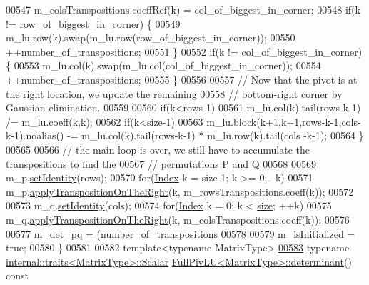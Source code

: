 \begin{DoxyCode}
00547     m\_colsTranspositions.coeffRef(k) = col\_of\_biggest\_in\_corner;
00548     \textcolor{keywordflow}{if}(k != row\_of\_biggest\_in\_corner) \{
00549       m\_lu.row(k).swap(m\_lu.row(row\_of\_biggest\_in\_corner));
00550       ++number\_of\_transpositions;
00551     \}
00552     \textcolor{keywordflow}{if}(k != col\_of\_biggest\_in\_corner) \{
00553       m\_lu.col(k).swap(m\_lu.col(col\_of\_biggest\_in\_corner));
00554       ++number\_of\_transpositions;
00555     \}
00556 
00557     \textcolor{comment}{// Now that the pivot is at the right location, we update the remaining}
00558     \textcolor{comment}{// bottom-right corner by Gaussian elimination.}
00559 
00560     \textcolor{keywordflow}{if}(k<rows-1)
00561       m\_lu.col(k).tail(rows-k-1) /= m\_lu.coeff(k,k);
00562     \textcolor{keywordflow}{if}(k<size-1)
00563       m\_lu.block(k+1,k+1,rows-k-1,cols-k-1).noalias() -= m\_lu.col(k).tail(rows-k-1) * m\_lu.row(k).tail(cols
      -k-1);
00564   \}
00565 
00566   \textcolor{comment}{// the main loop is over, we still have to accumulate the transpositions to find the}
00567   \textcolor{comment}{// permutations P and Q}
00568 
00569   m\_p.\hyperlink{group___core___module_a6805bb75fd7966ea71895c24ff196444}{setIdentity}(rows);
00570   \textcolor{keywordflow}{for}(\hyperlink{group___core___module_a554f30542cc2316add4b1ea0a492ff02}{Index} k = size-1; k >= 0; --k)
00571     m\_p.\hyperlink{group___core___module_a5f98da0712570d0c4b12f61839ae4193}{applyTranspositionOnTheRight}(k, m\_rowsTranspositions.coeff(k));
00572 
00573   m\_q.\hyperlink{group___core___module_a6805bb75fd7966ea71895c24ff196444}{setIdentity}(cols);
00574   \textcolor{keywordflow}{for}(\hyperlink{group___core___module_a554f30542cc2316add4b1ea0a492ff02}{Index} k = 0; k < \hyperlink{group___core___module_ac2c9348df3bb9c0044dbae6c278a8977}{size}; ++k)
00575     m\_q.\hyperlink{group___core___module_a5f98da0712570d0c4b12f61839ae4193}{applyTranspositionOnTheRight}(k, m\_colsTranspositions.coeff(k));
00576 
00577   m\_det\_pq = (number\_of\_transpositions%
00578 
00579   m\_isInitialized = \textcolor{keyword}{true};
00580 \}
00581 
00582 \textcolor{keyword}{template}<\textcolor{keyword}{typename} MatrixType>
\hyperlink{group___l_u___module_a71654e5c60a26407ecccfaa5b34bb0aa}{00583} \textcolor{keyword}{typename} \hyperlink{struct_eigen_1_1internal_1_1traits}{internal::traits<MatrixType>::Scalar} 
      \hyperlink{group___l_u___module_a71654e5c60a26407ecccfaa5b34bb0aa}{FullPivLU<MatrixType>::determinant}()\textcolor{keyword}{ const}

\end{DoxyCode}
